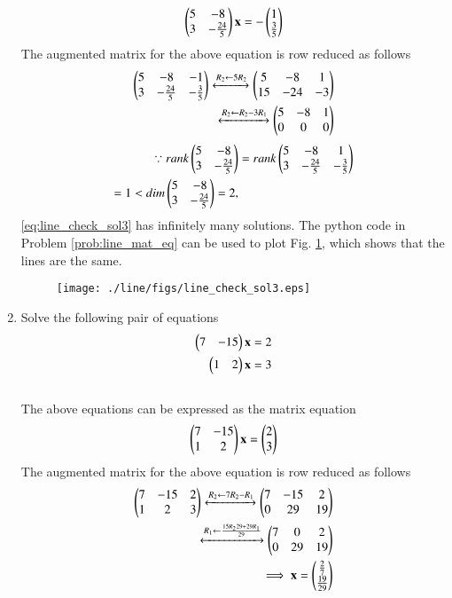 \begin{enumerate}[label=\arabic*.,ref=\thesubsection.\theenumi]
\begin{align}
\begin{pmatrix}5 & -8\\3 & -\frac{24}{5}\end{pmatrix} \mathbf{x} = -\begin{pmatrix}1\\ \frac{3}{5}\end{pmatrix}
\end{align}
%
The augmented matrix for the above equation is row reduced as follows
\begin{align}
\begin{pmatrix}5 & -8 & -1 \\3 & -\frac{24}{5} & -\frac{3}{5}\end{pmatrix} 
\xleftrightarrow {R_2\leftarrow 5R_2}\begin{pmatrix}5 & -8 & 1\\15 & -24 & -3\end{pmatrix} 
\\
\xleftrightarrow {R_2\leftarrow R_2 - 3R_1}\begin{pmatrix}5 & -8 & 1\\0 & 0 & 0\end{pmatrix} 
\end{align}
%
%
\begin{align}
\because rank \begin{pmatrix}5 & -8\\3 & -\frac{24}{5}\end{pmatrix} &= rank \begin{pmatrix}5 & -8 & 1 \\3 & -\frac{24}{5} & -\frac{3}{5}\end{pmatrix} 
\\
= 1 < dim \begin{pmatrix}5 & -8\\3 & -\frac{24}{5}\end{pmatrix} =2,
\end{align}
%
\eqref{eq:line_check_sol3} has infinitely many solutions.
%
The python code in Problem \ref{prob:line_mat_eq}
%
%
can be used to plot Fig. \ref{fig:line_check_sol3}, which shows that the lines are the same.
%
\begin{figure}[!ht]
\texttt{[image: ./line/figs/line\_check\_sol3.eps]}
\caption{}
\label{fig:line_check_sol3}
\end{figure}
%
%
\item Solve the following pair of equations
%
\begin{align}
\label{eq:line_check_sol_unique}
\begin{pmatrix}7 & -15\end{pmatrix}\mathbf{x}  &= 2 
\\
\begin{pmatrix} 1 & 2\end{pmatrix}\mathbf{x} &= 3
\end{align}
%
\\
\solution The above equations can be expressed as the matrix equation
\begin{align}
\begin{pmatrix}7 & -15\\1 & 2\end{pmatrix} \mathbf{x} = \begin{pmatrix}2\\ 3\end{pmatrix}
\end{align}
%
The augmented matrix for the above equation is row reduced as follows
\begin{align}
\begin{pmatrix}7 & -15 & 2\\1 & 2 & 3\end{pmatrix}
\xleftrightarrow {R_2\leftarrow 7R_2-R_1}\begin{pmatrix}7 & -15 & 2\\0 & 29 & 19\end{pmatrix}
\\
\xleftrightarrow {R_1\leftarrow \frac{15R_2 29+ 29R_1}{29}}\begin{pmatrix}7 & 0 & 2\\0 & 29 & 19\end{pmatrix} 
\\
\implies \mathbf{x} = \begin{pmatrix}\frac{2}{7}\\\frac{19}{29}\end{pmatrix}
\end{align}
%
%


\end{enumerate}
